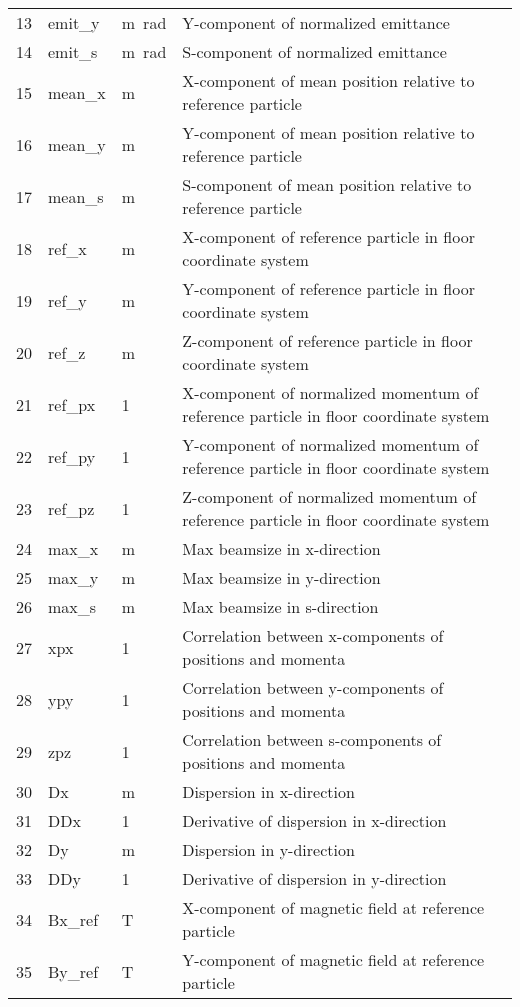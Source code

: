 \begin{center}
\begin{longtable}{p{1.5cm}p{1.7cm}p{1.3cm}p{9.5cm}}
13 & emit\_y & \si{\meter\radian} & Y-component of normalized emittance\\
14 & emit\_s & \si{\meter\radian} & S-component of normalized emittance\\
15 & mean\_x & \si{\meter} & X-component of mean position relative to reference particle\\
16 & mean\_y & \si{\meter} & Y-component of mean position relative to reference particle\\
17 & mean\_s & \si{\meter} & S-component of mean position relative to reference particle\\
18 & ref\_x & \si{\meter} & X-component of reference particle in floor coordinate system\\
19 & ref\_y & \si{\meter} & Y-component of reference particle in floor coordinate system\\
20 & ref\_z & \si{\meter} & Z-component of reference particle in floor coordinate system\\
21 & ref\_px & 1 & X-component of normalized momentum of reference particle in floor coordinate system\\
22 & ref\_py & 1 & Y-component of normalized momentum of reference particle in floor coordinate system\\
23 & ref\_pz & 1 & Z-component of normalized momentum of reference particle in floor coordinate system\\
24 & max\_x & \si{\meter} & Max beamsize in x-direction\\
25 & max\_y & \si{\meter} & Max beamsize in y-direction\\
26 & max\_s & \si{\meter} & Max beamsize in s-direction\\
27 & xpx & 1 & Correlation between x-components of positions and momenta\\
28 & ypy & 1 & Correlation between y-components of positions and momenta\\
29 & zpz & 1 & Correlation between s-components of positions and momenta\\
30 & Dx & \si{\meter} & Dispersion in x-direction\\
31 & DDx & 1 & Derivative of dispersion in x-direction\\
32 & Dy & \si{\meter} & Dispersion in y-direction\\
33 & DDy & 1 & Derivative of dispersion in y-direction\\
34 & Bx\_ref & \si{\tesla} & X-component of magnetic field at reference particle\\
35 & By\_ref & \si{\tesla} & Y-component of magnetic field at reference particle\\

\end{longtable}
\end{center}
